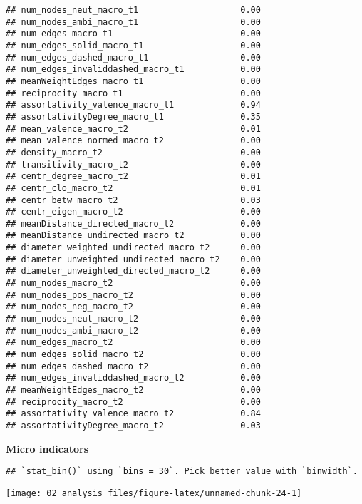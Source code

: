 \documentclass[
]{article}
\begin{document}
\begin{verbatim}
## num_nodes_neut_macro_t1                    0.00
## num_nodes_ambi_macro_t1                    0.00
## num_edges_macro_t1                         0.00
## num_edges_solid_macro_t1                   0.00
## num_edges_dashed_macro_t1                  0.00
## num_edges_invaliddashed_macro_t1           0.00
## meanWeightEdges_macro_t1                   0.00
## reciprocity_macro_t1                       0.00
## assortativity_valence_macro_t1             0.94
## assortativityDegree_macro_t1               0.35
## mean_valence_macro_t2                      0.01
## mean_valence_normed_macro_t2               0.00
## density_macro_t2                           0.00
## transitivity_macro_t2                      0.00
## centr_degree_macro_t2                      0.01
## centr_clo_macro_t2                         0.01
## centr_betw_macro_t2                        0.03
## centr_eigen_macro_t2                       0.00
## meanDistance_directed_macro_t2             0.00
## meanDistance_undirected_macro_t2           0.00
## diameter_weighted_undirected_macro_t2      0.00
## diameter_unweighted_undirected_macro_t2    0.00
## diameter_unweighted_directed_macro_t2      0.00
## num_nodes_macro_t2                         0.00
## num_nodes_pos_macro_t2                     0.00
## num_nodes_neg_macro_t2                     0.00
## num_nodes_neut_macro_t2                    0.00
## num_nodes_ambi_macro_t2                    0.00
## num_edges_macro_t2                         0.00
## num_edges_solid_macro_t2                   0.00
## num_edges_dashed_macro_t2                  0.00
## num_edges_invaliddashed_macro_t2           0.00
## meanWeightEdges_macro_t2                   0.00
## reciprocity_macro_t2                       0.00
## assortativity_valence_macro_t2             0.84
## assortativityDegree_macro_t2               0.03
\end{verbatim}

\textbf{Micro indicators}

\begin{verbatim}
## `stat_bin()` using `bins = 30`. Pick better value with `binwidth`.
\end{verbatim}

\begin{center}\texttt{[image: 02\_analysis\_files/figure-latex/unnamed-chunk-24-1]} \end{center}
\end{document}
